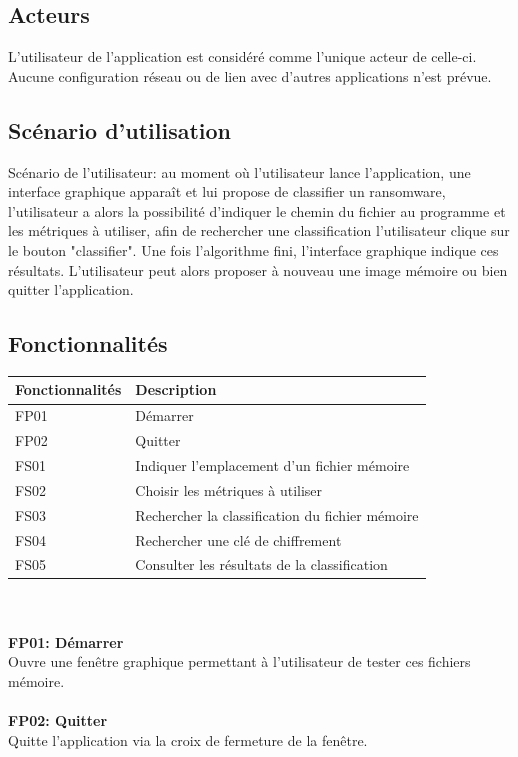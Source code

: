 \documentclass[a4paper, 12pt, twoside]{article}
\begin{document}
\subsection{Acteurs}
L’utilisateur de l’application est considéré comme l’unique acteur de celle-ci. Aucune configuration réseau ou de lien avec d'autres applications n'est prévue.
\subsection{Scénario d'utilisation}
\large Scénario de l'utilisateur:
au moment où l'utilisateur lance l'application, une interface graphique apparaît et lui propose de classifier un ransomware, l'utilisateur a alors la possibilité d'indiquer le chemin du fichier au programme et les métriques à utiliser, afin de rechercher une classification l'utilisateur clique sur le bouton "classifier". Une fois l'algorithme fini, l'interface graphique indique ces résultats.
L'utilisateur peut alors proposer à nouveau une image mémoire ou bien quitter l'application.
\subsection{Fonctionnalités}
\begin{tabular}{|l|l|}
    \hline
   Fonctionnalités & Description\\
   \hline
   FP01 & Démarrer\\
   \hline
   FP02 & Quitter\\
   \hline
   FS01 & Indiquer l'emplacement d'un fichier mémoire\\
   \hline
   FS02 & Choisir les métriques à utiliser\\
   \hline
   FS03 & Rechercher la classification du fichier mémoire\\
   \hline
   FS04 & Rechercher une clé de chiffrement\\
   \hline
   FS05 & Consulter les résultats de la classification\\
   \hline
\end{tabular}\\
\paragraph{}
{\bfseries FP01: Démarrer}\\
Ouvre une fenêtre graphique permettant à l'utilisateur de tester ces fichiers mémoire.
\paragraph{}
{\bfseries FP02: Quitter}\\
Quitte l'application via la croix de fermeture de la fenêtre.
\end{document}
